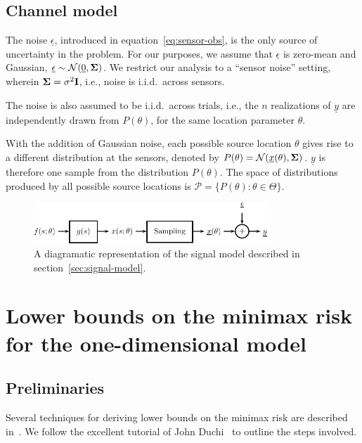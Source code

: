 \documentclass[conference]{IEEEtran}
\providecommand{\v}{}
\renewcommand{\v}[1]{\underline{#1}}
\providecommand{\m}{}
\renewcommand{\m}[1]{{\bf #1}}
\begin{document}
\subsection{Channel model}
\label{sec:channel-model}

The noise $\v \epsilon$, introduced in equation~\eqref{eq:sensor-obs}, is the
only source of uncertainty in the problem. For our purposes, we assume that $\v
\epsilon$ is zero-mean and Gaussian, $\v \epsilon \sim \mathcal{N}(\v 0, \m
\Sigma)$. We restrict our analysis to a ``sensor noise'' setting, wherein
$\m\Sigma = \sigma^2 \m I$, i.e., noise is i.i.d.\ across sensors.

The noise is also assumed to be i.i.d.\ across trials, i.e., the $n$
realizations of $\v y$ are independently drawn from $P(\theta)$, for the
same location parameter $\theta$.

With the addition of Gaussian noise, each possible source location $\theta$
gives rise to a different distribution at the sensors, denoted by $P(\theta) =
\mathcal{N}(\v x(\theta), \m \Sigma)$. $\v y$ is therefore one sample from the
distribution $P(\theta)$. The space of distributions produced by all possible
source locations is $\mathcal{P} = \{P(\theta) : \theta \in \Theta \}$.

\begin{figure}[tp] %
	\centering
	\includegraphics[width=3.5in]{block-diagram}
	\caption{A diagramatic representation of the signal model described in
	section~\ref{sec:signal-model}.}
	\label{fig:signal-model}
\end{figure}

\section{Lower bounds on the minimax risk for the one-dimensional model}
\label{sec:minimax-lower-bounds}

\subsection{Preliminaries}

Several techniques for deriving lower bounds on the minimax risk are described
in~\cite{Tsybakov2009Introduction}. We follow the excellent tutorial of John
Duchi~\cite{Duchi2015Information} to outline the steps involved.
\end{document}
